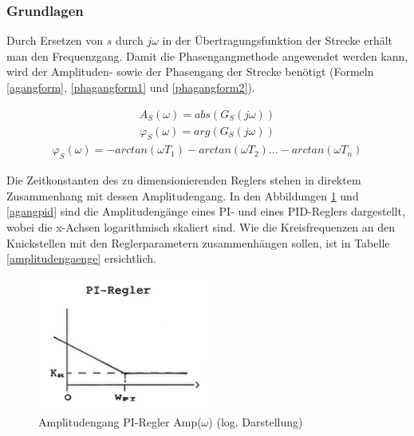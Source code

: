 \subsubsection{Grundlagen}
Durch Ersetzen von $s$ durch $j\omega$ in der Übertragungsfunktion der Strecke erhält man den Frequenzgang. Damit die Phasengangmethode angewendet werden kann, wird der Amplituden- sowie der Phasengang der Strecke benötigt (Formeln \ref{agangform}, \ref{phagangform1} und \ref{phagangform2}).


\begin{align}
A_S(\omega)=abs(G_S(j\omega))
\label{agangform}
\end{align}
\begin{align}
\varphi_S(\omega)=arg(G_S(j\omega))
\label{phagangform1}
\end{align}
\begin{align}
\varphi_S(\omega)=-arctan(\omega T_1)-arctan(\omega T_2)...-arctan(\omega T_n)
\label{phagangform2}
\end{align}\newline

Die Zeitkonstanten des zu dimensionierenden Reglers stehen in direktem Zusammenhang mit dessen Amplitudengang. In den Abbildungen \ref{agangpi} und \ref{agangpid} sind die Amplitudengänge eines PI- und eines PID-Reglers dargestellt, wobei die x-Achsen logarithmisch skaliert sind. Wie die Kreisfrequenzen an den Knickstellen mit den Reglerparametern zusammenhängen sollen, ist in Tabelle \ref{amplitudengaenge} ersichtlich.\newline

\begin{figure}[h]
\centering
\includegraphics[width=0.5\textwidth]{agangpi.png}
\caption{Amplitudengang PI-Regler Amp($\omega$) (log. Darstellung)}
\label{agangpi}
\end{figure}

